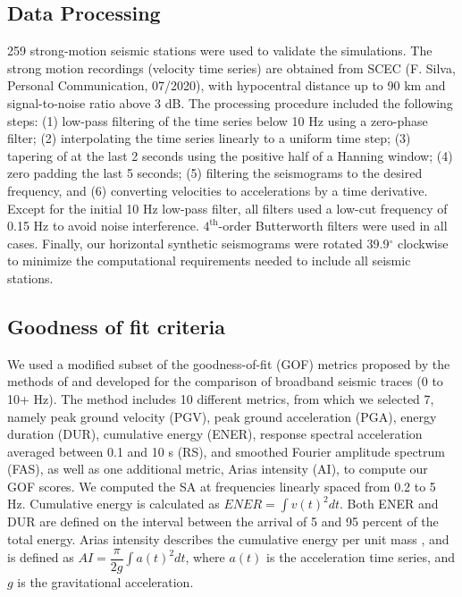 \subsection{Data Processing}
259 strong-motion seismic stations were used to validate the simulations. The strong motion recordings (velocity time series) are obtained from SCEC (F. Silva, Personal Communication, 07/2020), with hypocentral distance up to 90 km and signal-to-noise ratio above 3 dB. The processing procedure included the following steps: (1) low-pass filtering of the time series below 10 Hz using a zero-phase filter; (2) interpolating the time series linearly to a uniform time step; (3) tapering of at the last 2 seconds using the positive half of a Hanning window; (4) zero padding the last 5 seconds; (5) filtering the seismograms to the desired frequency, and (6) converting velocities to accelerations by a time derivative. Except for the initial 10 Hz low-pass filter, all filters used a low-cut frequency of 0.15 Hz to avoid noise interference. $4^{\text{th}}$-order Butterworth filters were used in all cases. Finally, our horizontal synthetic seismograms were rotated 39.9$^\circ$ clockwise to minimize the computational requirements needed to include all seismic stations.

\subsection{Goodness of fit criteria}
We used a modified subset of the goodness-of-fit (GOF) metrics proposed by the methods of \citet{andersonQuantitativeMeasureGoodnessOfFit2004} and \citet{olsenGoodnessoffitCriteriaBroadband2010} developed for the comparison of broadband seismic traces (0 to 10+ Hz). The method includes 10 different metrics, from which we selected 7, namely peak ground velocity (PGV), peak ground acceleration (PGA), energy duration (DUR), cumulative energy (ENER), response spectral acceleration averaged between 0.1 and 10 s (RS), and smoothed Fourier amplitude spectrum (FAS), as well as one additional metric, Arias intensity (AI), to compute our GOF scores. We computed the SA at frequencies linearly spaced from 0.2 to 5 Hz. Cumulative energy is calculated as $E N E R=\int v(t)^{2} d t$. Both ENER and DUR are defined on the interval between the arrival of 5 and 95 percent of the total energy. Arias intensity describes the cumulative energy per unit mass \citep{arias1970measure}, and is defined as $AI=\dfrac{\pi}{2 g} \int a(t)^{2} d t$, where $a(t)$ is the acceleration time series, and $g$ is the gravitational acceleration. 

